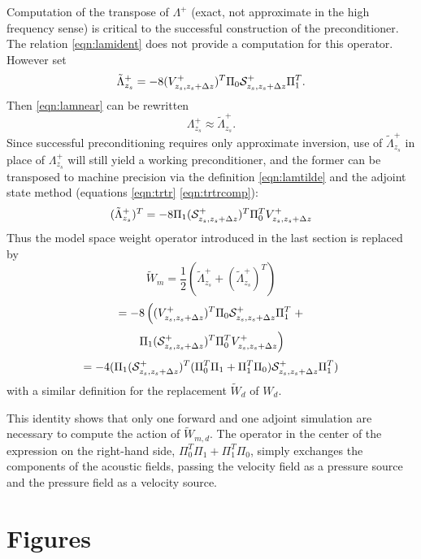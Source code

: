 Computation of the transpose of $\Lambda^+$ (exact, not approximate in
the high frequency sense) is critical to the successful
construction of the preconditioner. The relation \ref{eqn:lamident}
does not provide a computation for this operator. However set
\begin{equation}
  \label{eqn:lamtilde}
  \tilde{\Lambda}^+_{z_s} = -8(V^{+}_{z_s,z_s+\Delta z})^T\Pi_0 {\cal
    S}^+_{z_s,z_s+\Delta z}\Pi_1^T.
\end{equation}
Then \ref{eqn:lamnear} can be rewritten
\[
  \Lambda^+_{z_s} \approx \tilde{\Lambda}^+_{z_s}.
\]
Since successful preconditioning requires only approximate inversion,
use of $\tilde{\Lambda}^+_{z_s} $ in place of $\Lambda^+_{z_s}$ will
still yield a working preconditioner, and the former can be transposed
to machine precision via the definition \ref{eqn:lamtilde} and the adjoint state
method (equations \ref{eqn:trtr} \ref{eqn:trtrcomp}):
\begin{equation}
  \label{eqn:lamtransp}
   (\tilde{\Lambda}^+_{z_s})^T = -8 \Pi_1 ({\cal S}^+_{z_s,z_s+\Delta
     z})^T\Pi_0^T V^{+}_{z_s,z_s+\Delta z}
 \end{equation}
Thus the model space weight operator introduced in the last section is
replaced by
\[
  \tilde{W}_m = \frac{1}{2}(\tilde{\Lambda}^+_{z_s} +
  (\tilde{\Lambda}^+_{z_s})^T)
\]
\[
  = -8 \left((V^{+}_{z_s,z_s+\Delta z})^T\Pi_0 {\cal
    S}^+_{z_s,z_s+\Delta z}\Pi_1^T \right.+
\]
\[
  \left. \Pi_1 ({\cal S}^+_{z_s,z_s+\Delta
      z})^T\Pi_0^T V^{+}_{z_s,z_s+\Delta z}\right)
\]
\begin{equation}
  \label{eqn:wcomp}
  = -4(\Pi_1 ({\cal S}^+_{z_s,z_s+\Delta z})^T(\Pi_0^T\Pi_1 + \Pi_1^T\Pi_0) {\cal S}^+_{z_s,z_s+\Delta z}\Pi_1^T)
\end{equation}
with a similar definition for the replacement $\tilde{W}_d$ of $W_d$.

This identity shows that only one forward and one adjoint simulation
are necessary to compute the action of $\tilde{W}_{m,d}$. The operator
in the center of the expression on the right-hand side, $\Pi_0^T\Pi_1
+ \Pi_1^T\Pi_0$, simply exchanges the components of the acoustic
fields, passing the velocity field as a pressure source and the
pressure field as a velocity source.


 \newpage
 
\section{Figures}


